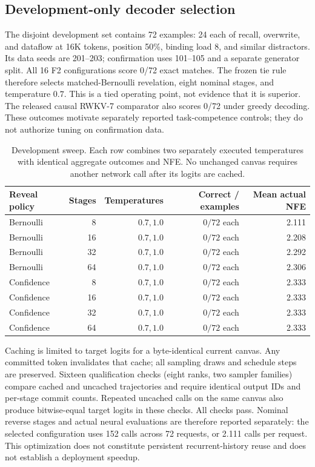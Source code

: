 \subsection{Development-only decoder selection}
\label{m:devselection}
The disjoint development set contains 72 examples: 24 each of recall, overwrite, and dataflow at 16K tokens, position 50\%, binding load 8, and similar distractors. Its data seeds are 201--203; confirmation uses 101--105 and a separate generator split. All 16 F2 configurations score 0/72 exact matches. The frozen tie rule therefore selects matched-Bernoulli revelation, eight nominal stages, and temperature $0.7$. This is a tied operating point, not evidence that it is superior. The released causal RWKV-7 comparator also scores 0/72 under greedy decoding. These outcomes motivate separately reported task-competence controls; they do not authorize tuning on confirmation data.

\begin{table}[h]
\centering\small
\begin{tabular}{@{}lrrrr@{}}
\toprule
Reveal policy & Stages & Temperatures & Correct / examples & Mean actual NFE\\
\midrule
Bernoulli & 8 & $0.7,1.0$ & $0/72$ each & 2.111\\
Bernoulli & 16 & $0.7,1.0$ & $0/72$ each & 2.208\\
Bernoulli & 32 & $0.7,1.0$ & $0/72$ each & 2.292\\
Bernoulli & 64 & $0.7,1.0$ & $0/72$ each & 2.306\\
Confidence & 8 & $0.7,1.0$ & $0/72$ each & 2.333\\
Confidence & 16 & $0.7,1.0$ & $0/72$ each & 2.333\\
Confidence & 32 & $0.7,1.0$ & $0/72$ each & 2.333\\
Confidence & 64 & $0.7,1.0$ & $0/72$ each & 2.333\\
\bottomrule
\end{tabular}
\caption{Development sweep. Each row combines two separately executed temperatures with identical aggregate outcomes and NFE. No unchanged canvas requires another network call after its logits are cached.}
\label{tab:devselection}
\end{table}

Caching is limited to target logits for a byte-identical current canvas. Any committed token invalidates that cache; all sampling draws and schedule steps are preserved. Sixteen qualification checks (eight ranks, two sampler families) compare cached and uncached trajectories and require identical output IDs and per-stage commit counts. Repeated uncached calls on the same canvas also produce bitwise-equal target logits in these checks. All checks pass. Nominal reverse stages and actual neural evaluations are therefore reported separately: the selected configuration uses 152 calls across 72 requests, or 2.111 calls per request. This optimization does not constitute persistent recurrent-history reuse and does not establish a deployment speedup.

